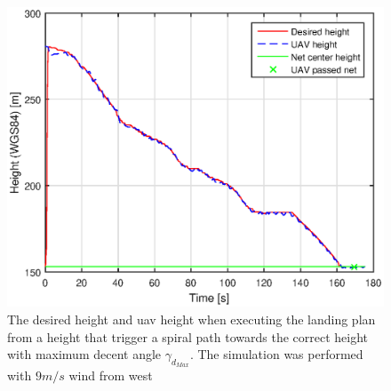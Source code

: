 \begin{figure}[H]
\centering
\includegraphics[scale=0.7]{figs/SysPlot/SILHeightSpiral6juni092307.eps}
\caption{The desired height and \gls{uav} height when executing the landing plan from a height that trigger a spiral path towards the correct height with maximum decent angle $\gamma_{d_{Max}}$. The simulation was performed with $9 m/s$ wind from west}
\label{Fig:SILHeightSpiral092307}
\end{figure}
